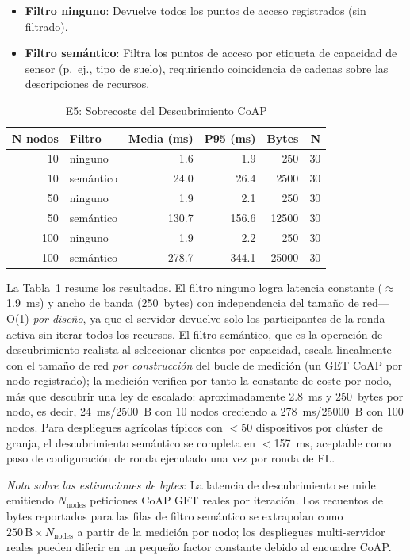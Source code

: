 \documentclass[journal]{IEEEtran}
\begin{document}
\begin{itemize}
    \item \textbf{Filtro ninguno}: Devuelve todos los puntos de acceso registrados (sin filtrado).
    \item \textbf{Filtro semántico}: Filtra los puntos de acceso por etiqueta de capacidad de sensor (p.~ej., tipo de suelo), requiriendo coincidencia de cadenas sobre las descripciones de recursos.
\end{itemize}

\begin{table}[t]
\centering
\caption{E5: Sobrecoste del Descubrimiento CoAP}
\label{tab:e5}
\footnotesize
\begin{tabular}{r l r r r r}
\toprule
\textbf{N nodos} & \textbf{Filtro} & \textbf{Media (ms)} & \textbf{P95 (ms)} & \textbf{Bytes} & \textbf{N} \\
\midrule
10  & ninguno  & 1.6  & 1.9  & 250   & 30 \\
10  & semántico & 24.0 & 26.4 & 2500  & 30 \\
50  & ninguno  & 1.9  & 2.1  & 250   & 30 \\
50  & semántico & 130.7 & 156.6 & 12500 & 30 \\
100 & ninguno  & 1.9  & 2.2  & 250   & 30 \\
100 & semántico & 278.7 & 344.1 & 25000 & 30 \\
\bottomrule
\end{tabular}
\end{table}

La Tabla~\ref{tab:e5} resume los resultados. El filtro ninguno logra latencia constante ($\approx$1.9~ms) y ancho de banda (250~bytes) con independencia del tamaño de red---O(1) \emph{por diseño}, ya que el servidor devuelve solo los participantes de la ronda activa sin iterar todos los recursos. El filtro semántico, que es la operación de descubrimiento realista al seleccionar clientes por capacidad, escala linealmente con el tamaño de red \emph{por construcción} del bucle de medición (un GET CoAP por nodo registrado); la medición verifica por tanto la constante de coste por nodo, más que descubrir una ley de escalado: aproximadamente 2.8~ms y 250~bytes por nodo, es decir, 24~ms/2500~B con 10 nodos creciendo a 278~ms/25000~B con 100 nodos. Para despliegues agrícolas típicos con $<$50 dispositivos por clúster de granja, el descubrimiento semántico se completa en $<$157~ms, aceptable como paso de configuración de ronda ejecutado una vez por ronda de FL.

\emph{Nota sobre las estimaciones de bytes}: La latencia de descubrimiento se mide emitiendo $N_\text{nodes}$ peticiones CoAP GET reales por iteración. Los recuentos de bytes reportados para las filas de filtro semántico se extrapolan como $250\,\text{B} \times N_\text{nodes}$ a partir de la medición por nodo; los despliegues multi-servidor reales pueden diferir en un pequeño factor constante debido al encuadre CoAP.
\end{document}
